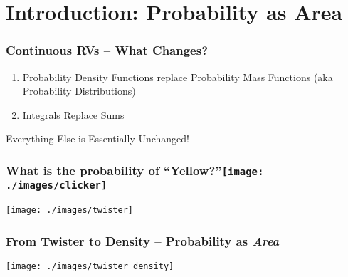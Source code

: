 \section{Introduction: Probability as Area}

\begin{frame}
\frametitle{Continuous RVs -- What Changes?}
	\begin{enumerate}
\item Probability Density Functions replace Probability Mass Functions (aka Probability Distributions)
\item Integrals Replace Sums
\end{enumerate}
\begin{alertblock}{Everything Else is Essentially Unchanged!}\end{alertblock}


\end{frame}



\begin{frame}
\frametitle{What is the probability of ``Yellow?''\hfill \texttt{[image: ./images/clicker]}}
\centering
	\texttt{[image: ./images/twister]}

\end{frame}

%
%
%





\begin{frame}
\frametitle{From Twister to Density -- Probability as \emph{Area}}

\centering
	\texttt{[image: ./images/twister\_density]}

\end{frame}


